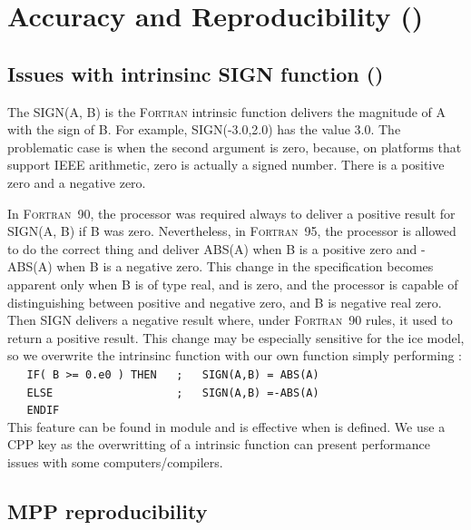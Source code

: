 \section{Accuracy and Reproducibility ()}
\label{MISC_fortran}

\subsection{Issues with intrinsinc SIGN function ()}
\label{MISC_sign}

The SIGN(A, B) is the \textsc {Fortran} intrinsic function delivers the magnitude 
of A with the sign of B. For example, SIGN(-3.0,2.0) has the value 3.0.
The problematic case is when the second argument is zero, because, on platforms 
that support IEEE arithmetic, zero is actually a signed number. 
There is a positive zero and a negative zero.

In \textsc{Fortran}~90, the processor was required always to deliver a positive result for SIGN(A, B) 
if B was zero. Nevertheless, in \textsc{Fortran}~95, the processor is allowed to do the correct thing 
and deliver ABS(A) when B is a positive zero and -ABS(A) when B is a negative zero. 
This change in the specification becomes apparent only when B is of type real, and is zero, 
and the processor is capable of distinguishing between positive and negative zero, 
and B is negative real zero. Then SIGN delivers a negative result where, under \textsc{Fortran}~90 
rules,  it used to return a positive result. 
This change may be especially sensitive for the ice model, so we overwrite the intrinsinc 
function with our own function simply performing :   \\
\verb?   IF( B >= 0.e0 ) THEN   ;   SIGN(A,B) = ABS(A)  ?    \\
\verb?   ELSE                   ;   SIGN(A,B) =-ABS(A)     ?  \\
\verb?   ENDIF    ? \\
This feature can be found in  module and is effective when 
is defined. We use a CPP key as the overwritting of a intrinsic function can present 
performance issues with some computers/compilers.


\subsection{MPP reproducibility}
\label{MISC_glosum}

